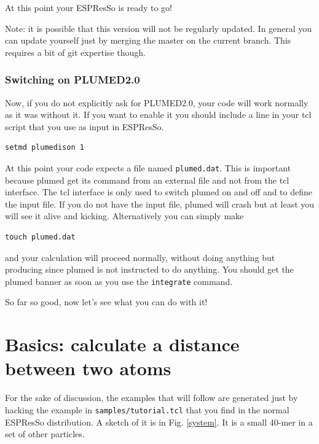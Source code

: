 \documentclass[10pt,fleqn,a4paper]{report}
\begin{document}
At this point your ESPResSo is ready to go!

Note: it is possible that this version will not be regularly updated.
In general you can update yourself just by merging the master on the current branch. 
This requires a bit of git expertise though. 


\subsection{Switching on PLUMED2.0}
Now, if you do not explicitly ask for PLUMED2.0, your code will work normally as it was without it.
If you want to enable it you should include a line in your tcl script that you use as input in ESPResSo.
\begin{verbatim}
setmd plumedison 1
\end{verbatim}
At this point your code expects a file named \texttt{plumed.dat}. 
This is important because plumed get its command from an external file and not from the tcl interface. The tcl interface is only used to switch plumed on and off and to define the input file.
If you do not have the input file, plumed
will crash but at least you will see it alive and kicking. 
Alternatively you can simply make 
\begin{verbatim}
touch plumed.dat
\end{verbatim}
and your calculation will proceed normally, without doing anything but producing since plumed 
is not instructed to do anything. You should get 
the plumed banner as soon as you use the \texttt{integrate} command.


So far so good, now let's see what you can do with it!

\chapter{Basics: calculate a distance between two atoms}

For the sake of discussion, the examples that will follow are generated just by hacking 
the example in \texttt{samples/tutorial.tcl} that you find in the normal ESPResSo distribution.
A sketch of it is in Fig. \ref{system}. It is a small 40-mer in a set of other particles.
\end{document}
